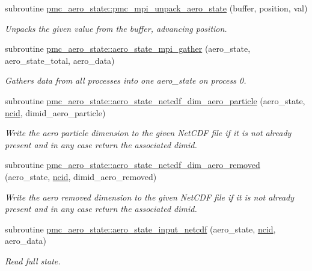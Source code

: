 \begin{DoxyCompactItemize}
subroutine \mbox{\hyperlink{namespacepmc__aero__state_a1fbfce661ac4cf88b383e88a44e0a9b6}{pmc\+\_\+aero\+\_\+state\+::pmc\+\_\+mpi\+\_\+unpack\+\_\+aero\+\_\+state}} (buffer, position, val)
\begin{DoxyCompactList}\small\item\em Unpacks the given value from the buffer, advancing position. \end{DoxyCompactList}\item 
subroutine \mbox{\hyperlink{namespacepmc__aero__state_ac8b1291fc517ab1d3ffe9642ab577c6c}{pmc\+\_\+aero\+\_\+state\+::aero\+\_\+state\+\_\+mpi\+\_\+gather}} (aero\+\_\+state, aero\+\_\+state\+\_\+total, aero\+\_\+data)
\begin{DoxyCompactList}\small\item\em Gathers data from all processes into one aero\+\_\+state on process 0. \end{DoxyCompactList}\item 
subroutine \mbox{\hyperlink{namespacepmc__aero__state_acb748f0c0c6c37180e896af05acb1c19}{pmc\+\_\+aero\+\_\+state\+::aero\+\_\+state\+\_\+netcdf\+\_\+dim\+\_\+aero\+\_\+particle}} (aero\+\_\+state, \mbox{\hyperlink{fractal_8_f90_a4e89f3f850921ff84a6dfce8b166ad50}{ncid}}, dimid\+\_\+aero\+\_\+particle)
\begin{DoxyCompactList}\small\item\em Write the aero particle dimension to the given Net\+C\+DF file if it is not already present and in any case return the associated dimid. \end{DoxyCompactList}\item 
subroutine \mbox{\hyperlink{namespacepmc__aero__state_a7d32f436e51ba2ff96838b47e2169585}{pmc\+\_\+aero\+\_\+state\+::aero\+\_\+state\+\_\+netcdf\+\_\+dim\+\_\+aero\+\_\+removed}} (aero\+\_\+state, \mbox{\hyperlink{fractal_8_f90_a4e89f3f850921ff84a6dfce8b166ad50}{ncid}}, dimid\+\_\+aero\+\_\+removed)
\begin{DoxyCompactList}\small\item\em Write the aero removed dimension to the given Net\+C\+DF file if it is not already present and in any case return the associated dimid. \end{DoxyCompactList}\item 
subroutine \mbox{\hyperlink{namespacepmc__aero__state_a2118eb683c0dc350e8f48a59ea8ed8ce}{pmc\+\_\+aero\+\_\+state\+::aero\+\_\+state\+\_\+input\+\_\+netcdf}} (aero\+\_\+state, \mbox{\hyperlink{fractal_8_f90_a4e89f3f850921ff84a6dfce8b166ad50}{ncid}}, aero\+\_\+data)
\begin{DoxyCompactList}\small\item\em Read full state. \end{DoxyCompactList}\item 

\end{DoxyCompactItemize}
